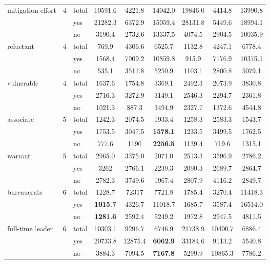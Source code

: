 {\begin{longtable}{@{ }p{2.2cm}@{ }l@{ }l@{}*{6}{S[table-format=5.1]}@{}}
\tablevspace
{  mitigation effort} &  4 &  total &  10591.6 &  4221.8 &  14042.0 &  19846.0 &  4414.8 &  13990.8\\
&  &  yes &  21282.3 &  6372.9 &  15059.4 &  28131.8 &  5449.6 &  18994.1\\
 &  &  no &  3190.4 &  2732.6 &  13337.5 &  4074.5 &  2904.5 &  10035.9\\

\tablevspace
{  reluctant} &  4 &  total &  769.9 &  4306.6 &  6525.7 &  1132.8 &  4247.1 &  6778.4\\
&  &  yes &  1568.4 &  7009.2 &  10859.8 &  915.9 &  7176.9 &  10375.1\\
 &  &  no &  535.1 &  3511.8 &  5250.9 &  1103.1 &  2800.8 &  5079.1\\

\tablevspace
{  vulnerable} &  4 &  total &  1637.6 &  1754.8 &  3369.1 &  2492.3 &  2073.9 &  3830.8\\
&  &  yes &  2716.3 &  3272.9 &  3149.1 &  2546.3 &  2294.7 &  2361.8\\
 &  &  no &  1021.3 &  887.3 &  3494.9 &  2327.7 &  1372.6 &  4544.8\\

\tablevspace
{  associate} &  5 &  total &  1242.3 &  2074.5 &  1933.4 &  1258.3 &  2583.3 &  1543.7\\
&  &  yes &  1753.5 &  3047.5 & \bfseries 1578.1 &  1233.5 &  3499.5 &  1762.5\\
 &  &  no &  777.6 &  1190 & \bfseries 2256.5 &  1139.4 &  719.6 &  1315.1\\

\tablevspace
{  warrant} &  5 &  total &  2965.0 &  3375.0 &  2071.0 &  2513.3 &  3596.9 &  2786.2\\
&  &  yes &  3262 &  2766.1 &  2239.3 &  2090.3 &  2689.7 &  2864.7\\
 &  &  no &  2782.3 &  3749.6 &  1967.4 &  2807.9 &  4116.2 &  2849.7\\

\tablevspace
{  bureaucrats} &  6 &  total &  1228.7 &  72317 &  7721.8 &  1785.4 &  3270.4 &  11418.3\\
&  &  yes & \bfseries 1015.7 &  4326.7 &  11018.7 &  1685.7 &  3587.4 &  16514.0\\
 &  &  no & \bfseries 1281.6 &  2592.4 &  5249.2 &  1972.8 &  2947.5 &  4811.5\\

\tablevspace
{  full-time leader} &  6 &  total &  10303.1 &  9296.7 &  6746.9 &  21738.9 &  10400.7 &  6886.4\\
&  &  yes &  20733.8 &  12875.4 & \bfseries 6062.9 &  33184.6 &  9113.2 &  5540.8\\
 &  &  no &  3884.3 &  7094.5 & \bfseries 7167.8 &  5299.9 &  10865.3 &  7786.2\\


\end{longtable}}
